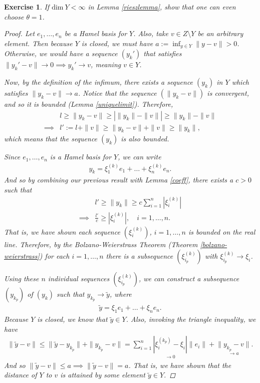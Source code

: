 \documentclass[11pt]{article}
\theoremstyle{mystyle}
\newtheorem{protoexer}{Exercise}[section]
\newenvironment{exer}
{\colorlet{shadecolor}{blue!15}\begin{shaded}\begin{protoexer}}
{\end{protoexer}\end{shaded}}
\newcommand{\0}{\mathbf{0}}
\begin{document}
\begin{exer}
If $\text{dim} \ Y < \infty$ in Lemma \ref{rieszlemma}, show that one can even choose $\theta = 1$.
\begin{proof}
Let $e_1, \ldots, e_n$ be a Hamel basis for $Y$. Also, take $v \in Z\setminus Y$ be an arbitrary element. Then because $Y$ is closed, we must have $a := \inf_{y \in Y}\|y - v\| > 0$. Otherwise, we would have a sequence $(y_k')$ that satisfies $\|y_k' - v\| \longrightarrow 0 \implies y_k' \longrightarrow v$, meaning $v \in Y$.

Now, by the definition of the infimum, there exists a sequence $(y_k)$ in $Y$ which satisfies $\|y_k - v\| \longrightarrow a$. Notice that the sequence $(\|y_k - v\|)$ is convergent, and so it is bounded (Lemma \ref{uniquelimit}). Therefore,
\begin{align*}
    &l \geq \|y_k - v\| \geq | \|y_k\| - \|v\| | \geq \|y_k\| - \|v\|\\
    \implies&l' := l + \|v\| \geq \|y_k - v\| + \|v\| \geq \|y_k\|,
\end{align*}
which means that the sequence $(y_k)$ is also bounded.

Since $e_1, \ldots, e_n$ is a Hamel basis for $Y$, we can write
\begin{align*}
    y_k = \xi_1^{(k)}e_1 + \ldots + \xi_n^{(k)}e_n.
\end{align*}
And so by combining our previous result with Lemma \ref{coeff}, there exists a $c > 0$ such that
\begin{align*}
    &l' \geq \|y_k\| \geq c\sum_{i=1}^n \left|\xi_i^{(k)} \right|\\
    \implies&\frac{l'}{c} \geq \left|\xi_i^{(k)} \right|, \quad i = 1, \ldots, n.
\end{align*}
That is, we have shown each sequence $\left( \xi_i^{(k)}  \right)$, $i = 1, \ldots, n$ is bounded on the real line. Therefore, by the Bolzano-Weierstrass Theorem (Theorem \ref{bolzano-weierstrass}) for each $i = 1, \ldots, n$ there is a subsequence $\left( \xi_{i_p}^{(k)} \right)$ with $\xi_{i_p}^{(k)} \longrightarrow \xi_i$.

Using these $n$ individual sequences $\left( \xi_{i_p}^{(k)} \right)$, we can construct a subsequence $(y_{k_p})$ of $(y_k)$ such that $y_{k_p} \longrightarrow \tilde{y}$, where
\begin{align*}
    \tilde{y} = \xi_1 e_1 + \ldots + \xi_n e_n.
\end{align*}
Because $Y$ is closed, we know that $\tilde{y} \in Y$. Also, invoking the triangle inequality, we have
\begin{align*}
    \|\tilde{y} - v\| \leq \|\tilde{y} - y_{k_p}\| + \|y_{k_p} - v\| = \sum_{i=1}^n\underset{\longrightarrow0}{|\xi_i^{(k_p)} - \xi_i|} \|e_i\| + \underset{\longrightarrow a}{\|y_{k_p} - v\|}.
\end{align*}
And so $\|\tilde{y} - v\| \leq a \implies \|\tilde{y} - v\| = a$. That is, we have shown that the distance of $Y$ to $v$ is attained by some element $\tilde{y} \in Y$.


\end{proof}
\end{exer}
\end{document}
